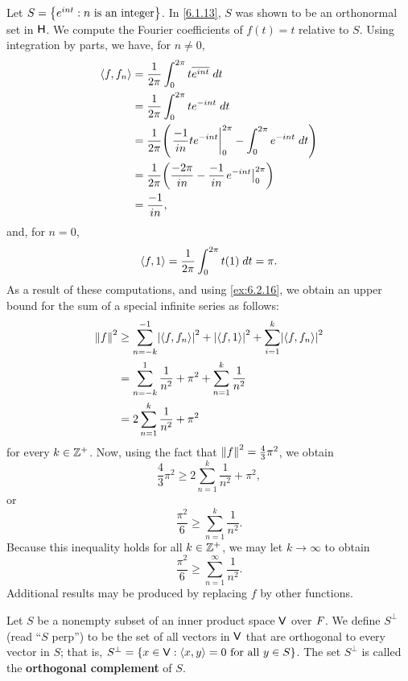 \begin{eg}\label{6.2.8}
	Let \(S = \left\lbrace e^{int} : n \text{ is an integer}\right\rbrace\).
	In \cref{6.1.13}, \(S\) was shown to be an orthonormal set in \(\mathsf{H}\).
	We compute the Fourier coefficients of \(f(t) = t\) relative to \(S\).
	Using integration by parts, we have, for \(n \neq 0\),
	\begin{align*}
		\inn{f, f_n} & = \frac{1}{2 \pi} \int_0^{2 \pi} t \conj{e^{int}} \; dt                                          \\
		             & = \frac{1}{2 \pi} \int_0^{2 \pi} t e^{-int} \; dt                                                \\
		             & = \frac{1}{2 \pi} \pa{\eval{\frac{-1}{in} t e^{-int}}_0^{2 \pi} - \int_0^{2 \pi} e^{-int} \; dt} \\
		             & = \frac{1}{2 \pi} \pa{\frac{-2 \pi}{in} - \frac{-1}{in} \eval{e^{-int}}_0^{2 \pi}}               \\
		             & = \frac{-1}{in},
	\end{align*}
	and, for \(n = 0\),
	\[
		\left\langle f, 1\right\rangle = \frac{1}{2 \pi} \int_0^{2 \pi} t(1) \; dt = \pi.
	\]
	As a result of these computations, and using \cref{ex:6.2.16}, we obtain an upper bound for the sum of a special infinite series as follows:
	\begin{align*}
		\norm{f}^2 & \geq \sum_{n = -k}^{-1} \abs{\inn{f, f_n}}^2 + \abs{\inn{f, 1}}^2 + \sum_{i = 1}^k \abs{\inn{f, f_n}}^2 \\
		           & = \sum_{n = -k}^1 \frac{1}{n^2} + \pi^2 + \sum_{n = 1}^k \frac{1}{n^2}                                  \\
		           & = 2 \sum_{n = 1}^k \frac{1}{n^2} + \pi^2
	\end{align*}
	for every \(k \in \mathbb{Z}^+\).
	Now, using the fact that \(\left\lVert f\right\rVert^2 = \frac{4}{3} \pi^2\), we obtain
	\[
		\frac{4}{3} \pi^2 \geq 2 \sum_{n = 1}^k \frac{1}{n^2} + \pi^2,
	\]
	or
	\[
		\frac{\pi^2}{6} \geq \sum_{n = 1}^k \frac{1}{n^2}.
	\]
	Because this inequality holds for all \(k \in \mathbb{Z}^+\), we may let \(k \to \infty\) to obtain
	\[
		\frac{\pi^2}{6} \geq \sum_{n = 1}^\infty \frac{1}{n^2}.
	\]
	Additional results may be produced by replacing \(f\) by other functions.
\end{eg}

\begin{defn}\label{6.2.9}
	Let \(S\) be a nonempty subset of an inner product space \(\mathsf{V}\) over \(\mathit{F}\).
	We define \(S^{\perp}\) (read ``\(S\) perp'') to be the set of all vectors in \(\mathsf{V}\) that are orthogonal to every vector in \(S\);
	that is, \(S^{\perp} = \left\lbrace x \in \mathsf{V} : \left\langle x, y\right\rangle = 0 \text{ for all } y \in S\right\rbrace\).
	The set \(S^{\perp}\) is called the \textbf{orthogonal complement} of \(S\).
\end{defn}

